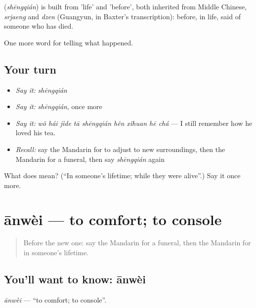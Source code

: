 \begin{cousinweb}
\textbf{} (\emph{shēngqián}) is built from  'life' and  'before', both inherited from Middle Chinese, \emph{srjaeng} and \emph{dzen} (Guangyun, in Baxter's transcription): before, in life, said of someone who has died.
\end{cousinweb}

\begin{grammarlens}[title={What you've built}]
One more word for telling what happened.
\end{grammarlens}

\subsection*{Your turn}
\begin{itemize}
\raggedright
  \item \emph{Say it:} \emph{shēngqián}
  \item \emph{Say it:} \emph{shēngqián}, once more
  \item \emph{Say it:} \emph{wǒ hái jìde tā shēngqián hěn xǐhuan hē chá} — I still remember how he loved his tea.
  \item \emph{Recall:} say the Mandarin for to adjust to new surroundings, then the Mandarin for a funeral, then say \emph{shēngqián} again
\end{itemize}

\begin{tcolorbox}[breakable,colback=teal!4,colframe=teal!35!black,title={Before you move on}]
What does  mean? (\textquotedblleft{}In someone's lifetime; while they were alive\textquotedblright{}.) Say it once more.
\end{tcolorbox}
\section[ānwèi]{ānwèi — to comfort; to console}

\label{lesson:ZH-C314-anwei}



\begin{quote}
Before the new one: say the Mandarin for a funeral, then the Mandarin for in someone's lifetime.
\end{quote}

\subsection*{You'll want to know: ānwèi}
\emph{ānwèi} — \textquotedblleft{}to comfort; to console\textquotedblright{}.

